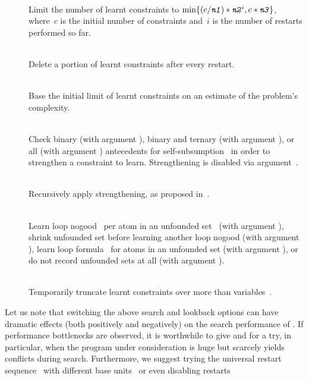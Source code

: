 \begin{description}
\item[]~\\
Limit the number of learnt constraints to 
$\min\{(c/\texttt{\textit{n1}})*\texttt{\textit{n2}}^i,c*\texttt{\textit{n3}}\}$,
where~$c$ is the initial number of constraints and~$i$ is the number of restarts performed so far.
\item[]~\\
Delete a portion of learnt constraints after every restart.
\item[]~\\
Base the initial limit of learnt constraints on an estimate
of the problem's complexity.
\item[]~\\
Check binary (with argument ),
binary and ternary (with argument ), or 
all (with argument ) antecedents for
self-subsumption~\cite{eenbie05a}
in order to strengthen a constraint to learn.
Strengthening is disabled via argument~.
\item[]~\\
Recursively apply strengthening, as proposed in~\cite{soreen05a}.
\item[]~\\
Learn loop nogood~\cite{gekanesc07a} per atom in an unfounded set~\cite{gerosc91a}
(with argument ),
shrink unfounded set before learning another loop nogood
(with argument ),
learn loop formula~\cite{linzha04a} for atoms in an unfounded set
(with argument ),
or do not record unfounded sets at all
(with argument ).
\item[]~\\
Temporarily truncate learnt constraints over more than  variables~\cite{ryan04a}.
\end{description}
%
Let us note that switching the above search and lookback options can have dramatic effects
(both positively and negatively) on the search performance of \clasp.
If performance bottlenecks are observed, it is worthwhile to give 
 and  for  a try, in particular,
when the program under consideration is huge 
but scarcely yields conflicts during search.
Furthermore, we suggest trying the universal restart sequence~\cite{lusizu93a}
with different base units~ or even disabling restarts
